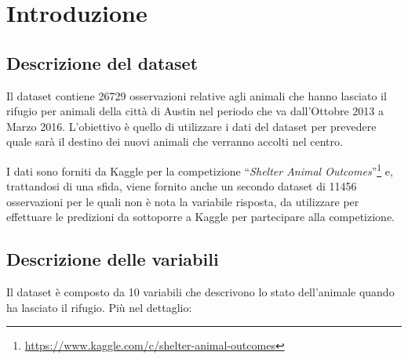 
\section{Introduzione}

\subsection{Descrizione del dataset}

Il dataset contiene 26729 osservazioni relative agli animali che hanno lasciato il rifugio per animali della città di Austin nel periodo che va dall'Ottobre 2013 a Marzo 2016.
L'obiettivo è quello di utilizzare i dati del dataset per prevedere quale sarà il destino dei nuovi animali che verranno accolti nel centro.

I dati sono forniti da Kaggle per la competizione ``\textit{Shelter Animal Outcomes}''\footnote{\url{https://www.kaggle.com/c/shelter-animal-outcomes}} e, trattandosi di una sfida, viene fornito anche un secondo dataset di 11456 osservazioni per le quali non è nota la variabile risposta, da utilizzare per effettuare le predizioni da sottoporre a Kaggle per partecipare alla competizione.

\subsection{Descrizione delle variabili}

Il dataset è composto da 10 variabili che descrivono lo stato dell'animale quando ha lasciato il rifugio.
Più nel dettaglio:

